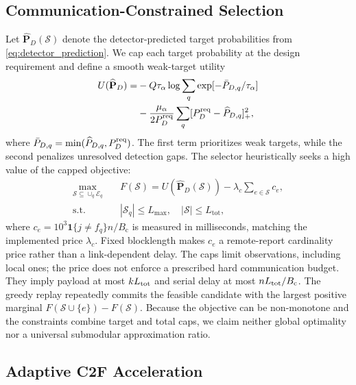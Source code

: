 \subsection{Communication-Constrained Selection}

Let $\widehat{\mathbf P}_D(\mathcal S)$ denote the detector-predicted target
probabilities from \eqref{eq:detector_prediction}. We cap each target probability
at the design requirement and define a smooth weak-target utility
\begin{equation}
\begin{aligned}
	U(\widehat{\mathbf P}_D)=&-Q\tau_\alpha\log\sum_q
	\exp[-\bar P_{D,q}/\tau_\alpha]\\
	&-\frac{\mu_\alpha}{2P_D^{\rm req}}
	\sum_q[P_D^{\rm req}-\widehat P_{D,q}]_+^2,
\end{aligned}
	\label{eq:fair_sensing_utility}
\end{equation}
where $\bar P_{D,q}=\min(\widehat P_{D,q},P_D^{\rm req})$. The first term
prioritizes weak targets, while the second penalizes unresolved detection gaps.
The selector heuristically seeks a high value of the capped objective:
\begin{equation}
\begin{aligned}
	\max_{\mathcal S\subseteq\cup_q\mathcal E_q}\quad
	&F(\mathcal S)=U(\widehat{\mathbf P}_D(\mathcal S))
	-\lambda_c\sum_{e\in\mathcal S}c_e,\\
	\mathrm{s.t.}\quad&|\mathcal S_q|\le L_{\max},\quad
	|\mathcal S|\le L_{\mathrm{tot}},
\end{aligned}
	\label{eq:task_objective}
\end{equation}
where $c_e=10^3\mathbf1\{j\ne f_q\}n/B_{\mathrm c}$ is measured in
milliseconds, matching the implemented price $\lambda_c$. Fixed blocklength makes
$c_e$ a remote-report cardinality price rather than a link-dependent delay.
The caps limit observations, including local ones; the price does not enforce
a prescribed hard communication budget. They imply payload at most
$kL_{\rm tot}$ and serial delay at most $nL_{\rm tot}/B_{\rm c}$.
The greedy replay repeatedly commits the feasible candidate with the largest
positive marginal $F(\mathcal S\cup\{e\})-F(\mathcal S)$. Because the objective
can be non-monotone and the constraints combine target and total caps, we claim
neither global optimality nor a universal submodular approximation ratio.

\subsection{Adaptive C2F Acceleration}


